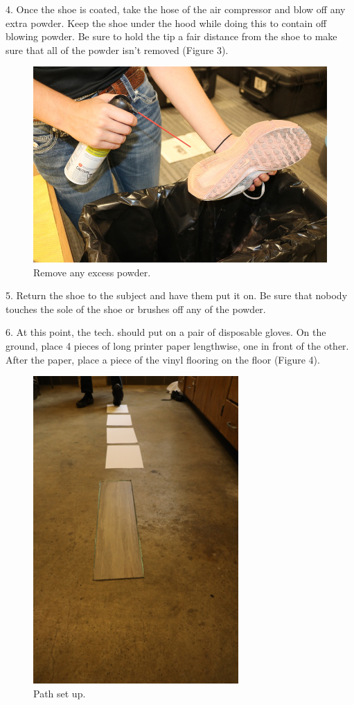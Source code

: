 \newpage

4. Once the shoe is coated, take the hose of the air compressor and blow off any extra powder. Keep the shoe under the hood while doing this to contain off blowing powder. Be sure to hold the tip a fair distance from the shoe to make sure that all of the powder isn't removed (Figure 3). 

\begin{figure}[!htp]
\centering
\includegraphics[scale=0.3]{Powder_Air}
\caption{Remove any excess powder.}
\label{Image 3}
\end{figure}

\newpage

5. Return the shoe to the subject and have them put it on. Be sure that nobody touches the sole of the shoe or brushes off any of the powder.

6. At this point, the tech. should put on a pair of disposable gloves. On the ground, place 4 pieces of long printer paper lengthwise, one in front of the other. After the paper, place a piece of the vinyl flooring on the floor (Figure 4). 

\begin{figure}[!htp]
\centering
\includegraphics[scale=0.5]{Path}
\caption{Path set up.}
\label{Image 4}
\end{figure}

